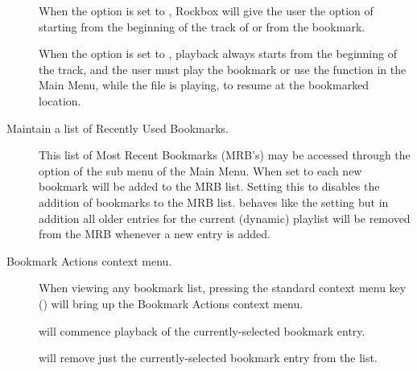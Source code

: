 \begin{description}
  When the  option is set to , Rockbox will
  give the user the option of starting from the beginning of the track
  of or from the bookmark. 

  When the  option is set to , playback always
  starts from the beginning of the track, and the user must play the bookmark
  or use the  function in the Main Menu, while the file
  is playing, to resume at the bookmarked location.
    
  \item [Maintain a list of Recently Used Bookmarks. ]

  This list of Most Recent Bookmarks (MRB's) may be accessed through the
   option of the  sub menu of the 
  Main Menu. When set to  each new bookmark will be added to the
  MRB list. Setting this to  disables the addition of bookmarks to
  the MRB list.  behaves like the  setting 
  but in addition all older entries for the current (dynamic) playlist will 
  be removed from the MRB whenever a new entry is added.
  
  \item [Bookmark Actions context menu.]
  
  When viewing any bookmark list, pressing the standard 
  context menu key (\ActionStdContext) will bring up the Bookmark Actions context menu.
  
   will commence playback of the currently-selected bookmark entry.
  
   will remove just the currently-selected bookmark entry from the list.
  \end{description}
